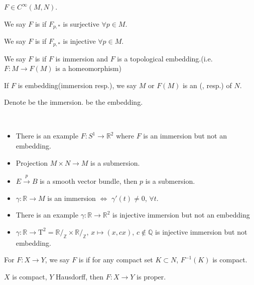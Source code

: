 \begin{definition}
    $ F\in C^\infty(M,N) $. 
    
    We say  $ F $ is  if  $ F_{p,*} $ is surjective $ \forall p\in M $.
    
    We say  $ F $ is  if  $ F_{p,*} $ is injective $ \forall p\in M $.

    We say  $ F $ is  if  $ F $ is  immersion and  $ F $ is a topological embedding.(i.e.  $ F:M\rightarrow F(M) $ is a homeomorphism) 

    If  $ F $ is embedding(immersion resp.), we say  $ M $ or  $ F(M) $ is an (, resp.) of  $ N $.   
    
    Denote   be the immersion.  be the embedding.
\end{definition}
\begin{example}
    \,\begin{itemize}
        \item There is an example  $ F:S^1\rightarrow\mathbb{R}^2 $ where  $ F $ is an immersion but not an embedding.
        \item  Projection $ M\times N\rightarrow M $ is a submersion.
        \item  $ E\xrightarrow{p}B $ is a smooth vector bundle, then  $ p $ is a submersion.
        \item  $ \gamma:\mathbb{R}\rightarrow M $ is an immersion $ \Leftrightarrow $ $ \gamma'(t)\neq 0 $,  $ \forall t $.
        \item There is an example  $ \gamma:\mathbb{R}\rightarrow \mathbb{R}^2 $ is injective immersion but not an embedding   
        \item  $ \gamma:\mathbb{R}\rightarrow \mathrm{T}^2=\mathbb{R}/_\mathbb{Z}\times   \mathbb{R}/_\mathbb{Z} $,  $ x\mapsto (x,cx) $,  $ c\not\in \mathbb{Q} $ is injective immersion but not embedding.         
    \end{itemize}
\end{example}
\begin{definition}
    For  $ F:X\rightarrow Y $, we say  $ F $ is  if for any compact set  $ K\subset N $,  $ F^{-1}(K) $ is compact.    
\end{definition}
\begin{lemma}
    $ X $ is compact,  $ Y $ Hausdorff, then  $ F:X\rightarrow Y $ is proper.  
\end{lemma}
